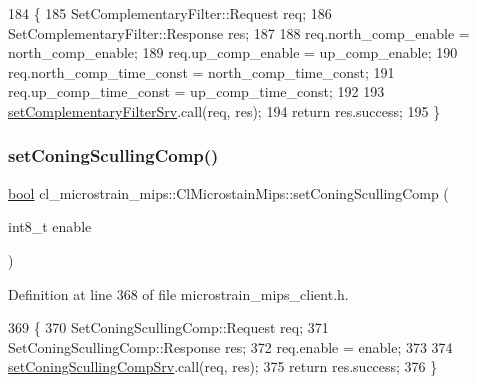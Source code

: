 \begin{DoxyCode}
184     \{
185         SetComplementaryFilter::Request req;
186         SetComplementaryFilter::Response res;
187 
188         req.north\_comp\_enable = north\_comp\_enable;
189         req.up\_comp\_enable = up\_comp\_enable;
190         req.north\_comp\_time\_const = north\_comp\_time\_const;
191         req.up\_comp\_time\_const = up\_comp\_time\_const;
192 
193         \hyperlink{classcl__microstrain__mips_1_1ClMicrostainMips_a54045931a06f909418ac284235c5dd5a}{setComplementaryFilterSrv}.call(req, res);
194         \textcolor{keywordflow}{return} res.success;
195     \}
\end{DoxyCode}
\mbox{\label{classcl__microstrain__mips_1_1ClMicrostainMips_a981895d2724594166bcf22247382ddcf}} 
\subsubsection{\texorpdfstring{set\+Coning\+Sculling\+Comp()}{setConingScullingComp()}}
{\footnotesize\ttfamily \hyperlink{classbool}{bool} cl\+\_\+microstrain\+\_\+mips\+::\+Cl\+Microstain\+Mips\+::set\+Coning\+Sculling\+Comp (\begin{DoxyParamCaption}\item[{int8\+\_\+t}]{enable }\end{DoxyParamCaption})\hspace{0.3cm}{\ttfamily [inline]}}



Definition at line 368 of file microstrain\+\_\+mips\+\_\+client.\+h.


\begin{DoxyCode}
369     \{
370         SetConingScullingComp::Request req;
371         SetConingScullingComp::Response res;
372         req.enable = enable;
373 
374         \hyperlink{classcl__microstrain__mips_1_1ClMicrostainMips_ae24545c615e2be170adced3999d94d84}{setConingScullingCompSrv}.call(req, res);
375         \textcolor{keywordflow}{return} res.success;
376     \}
\end{DoxyCode}
\mbox{\label{classcl__microstrain__mips_1_1ClMicrostainMips_aaa5987561df8840ec12ca1eecb852ad9}} 
